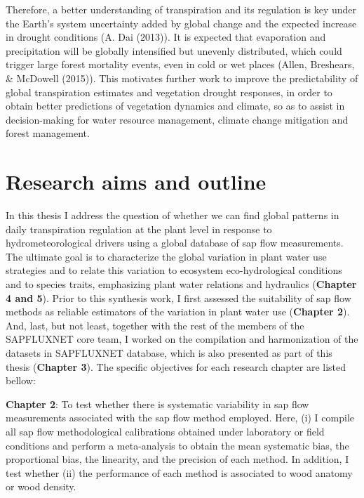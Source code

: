 \documentclass[11pt,twoside]{reedthesis}
\begin{document}
Therefore, a better understanding of transpiration and its regulation is
key under the Earth's system uncertainty added by global change and the
expected increase in drought conditions (A. Dai (2013)). It is expected
that evaporation and precipitation will be globally intensified but
unevenly distributed, which could trigger large forest mortality events,
even in cold or wet places (Allen, Breshears, \& McDowell (2015)). This
motivates further work to improve the predictability of global
transpiration estimates and vegetation drought responses, in order to
obtain better predictions of vegetation dynamics and climate, so as to
assist in decision-making for water resource management, climate change
mitigation and forest management.\par

\section{Research aims and outline}\label{research-aims-and-outline}

In this thesis I address the question of whether we can find global
patterns in daily transpiration regulation at the plant level in
response to hydrometeorological drivers using a global database of sap
flow measurements. The ultimate goal is to characterize the global
variation in plant water use strategies and to relate this variation to
ecosystem eco-hydrological conditions and to species traits, emphasizing
plant water relations and hydraulics (\textbf{Chapter 4 and 5}). Prior
to this synthesis work, I first assessed the suitability of sap flow
methods as reliable estimators of the variation in plant water use
(\textbf{Chapter 2}). And, last, but not least, together with the rest
of the members of the SAPFLUXNET core team, I worked on the compilation
and harmonization of the datasets in SAPFLUXNET database, which is also
presented as part of this thesis (\textbf{Chapter 3}). The specific
objectives for each research chapter are listed bellow:\par

\textbf{Chapter 2}: To test whether there is systematic variability in
sap flow measurements associated with the sap flow method employed.
Here, (i) I compile all sap flow methodological calibrations obtained
under laboratory or field conditions and perform a meta-analysis to
obtain the mean systematic bias, the proportional bias, the linearity,
and the precision of each method. In addition, I test whether (ii) the
performance of each method is associated to wood anatomy or wood
density.\par
\end{document}
